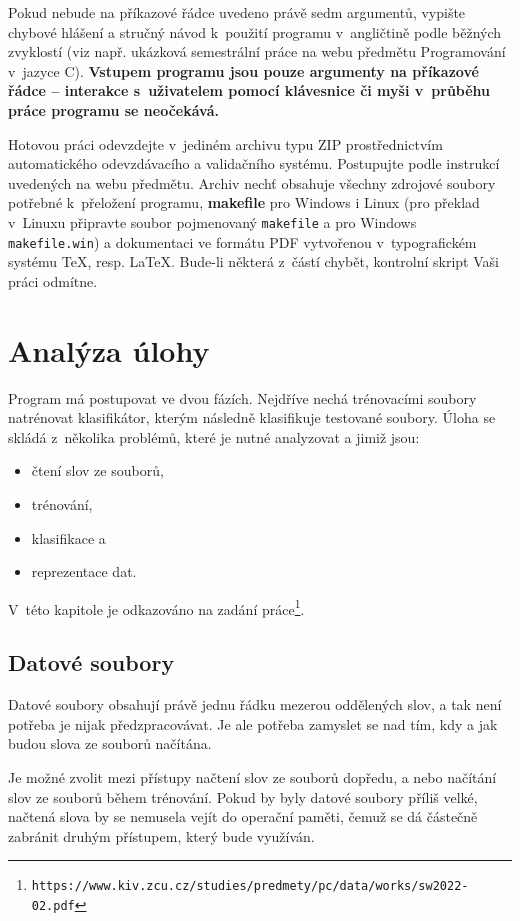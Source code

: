 \documentclass[a4paper, 12pt]{report}
\begin{document}
Pokud nebude na příkazové řádce uvedeno právě sedm argumentů, vypište 
chybové hlášení a stručný návod k~použití programu v~angličtině podle 
běžných zvyklostí (viz např. ukázková semestrální práce na webu předmětu 
Programování v~jazyce C). \textbf{Vstupem programu jsou pouze argumenty na 
příkazové řádce – interakce s~uživatelem pomocí klávesnice či myši
v~průběhu práce programu se neočekává.}

Hotovou práci odevzdejte v~jediném archivu typu ZIP prostřednictvím 
automatického odevzdávacího a validačního systému. Postupujte podle 
instrukcí uvedených na webu předmětu. Archiv nechť obsahuje všechny 
zdrojové soubory potřebné k~přeložení programu, \textbf{makefile} pro 
Windows i Linux (pro překlad v~Linuxu připravte soubor pojmenovaný 
\texttt{makefile} a pro Windows \texttt{makefile.win}) a dokumentaci ve 
formátu PDF vytvořenou v~typografickém systému \TeX, resp. \LaTeX. Bude-li 
některá z~částí chybět, kontrolní skript Vaši práci odmítne.

\chapter{Analýza úlohy}

Program má postupovat ve dvou fázích. Nejdříve nechá trénovacími soubory 
natrénovat klasifikátor, kterým následně klasifikuje testované soubory. 
Úloha se skládá z~několika problémů, které je nutné analyzovat a jimiž 
jsou:

\begin{itemize}
    \item čtení slov ze souborů,
    \item trénování,
    \item klasifikace a
    \item reprezentace dat.
\end{itemize}

V~této kapitole je odkazováno na zadání 
práce\footnote{\texttt{https://www.kiv.zcu.cz/studies/predmety/pc/data/works/sw2022-02.pdf}}.

\section{Datové soubory}

Datové soubory obsahují právě jednu řádku mezerou oddělených slov, a tak 
není potřeba je nijak předzpracovávat. Je ale potřeba zamyslet se nad tím, 
kdy a jak budou slova ze souborů načítána.

Je možné zvolit mezi přístupy načtení slov ze souborů dopředu, a nebo 
načítání slov ze souborů během trénování. Pokud by byly datové soubory 
příliš velké, načtená slova by se nemusela vejít do operační paměti, čemuž 
se dá částečně zabránit druhým přístupem, který bude využíván.
\end{document}

